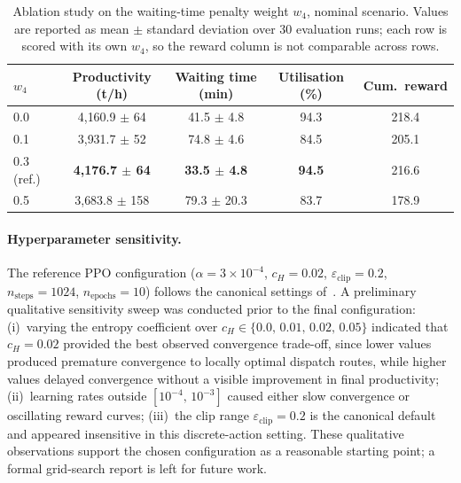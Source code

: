 \documentclass[11pt,a4paper]{article}
\begin{document}
\begin{table}[H]
\centering
\caption{Ablation study on the waiting-time penalty weight $w_4$, nominal scenario. Values are reported as mean $\pm$ standard deviation over 30 evaluation runs; each row is scored with its own $w_4$, so the reward column is not comparable across rows.}
\label{tab:ablation}
\small
\begin{tabular}{lcccc}
\toprule
\textbf{$w_4$} & \textbf{Productivity (t/h)} & \textbf{Waiting time (min)} & \textbf{Utilisation (\%)} & \textbf{Cum.\ reward} \\
\midrule
0.0  & 4{,}160.9 $\pm$ 64 & 41.5 $\pm$ 4.8 & 94.3 & 218.4 \\
0.1  & 3{,}931.7 $\pm$ 52 & 74.8 $\pm$ 4.6 & 84.5 & 205.1 \\
0.3 (ref.) & \textbf{4{,}176.7 $\pm$ 64} & \textbf{33.5 $\pm$ 4.8} & \textbf{94.5} & 216.6 \\
0.5  & 3{,}683.8 $\pm$ 158 & 79.3 $\pm$ 20.3 & 83.7 & 178.9 \\
\bottomrule
\end{tabular}

\end{table}

\paragraph{Hyperparameter sensitivity.}
The reference PPO configuration ($\alpha = 3 \times 10^{-4}$,
$c_H = 0.02$, $\varepsilon_{\text{clip}} = 0.2$,
$n_{\text{steps}} = 1024$, $n_{\text{epochs}} = 10$) follows the
canonical settings of~\cite{JohnSchulman2017}.
A preliminary qualitative sensitivity sweep was conducted prior to the final configuration:
(i)~varying the entropy coefficient over $c_H \in \{0.0,\, 0.01,\, 0.02,\, 0.05\}$
indicated that $c_H = 0.02$ provided the best observed convergence trade-off, since lower values produced premature convergence to locally optimal dispatch routes,
while higher values delayed convergence without a visible improvement in final productivity;
(ii)~learning rates outside $[10^{-4},\, 10^{-3}]$ caused either slow convergence
or oscillating reward curves;
(iii)~the clip range $\varepsilon_{\text{clip}} = 0.2$ is the canonical default~\cite{JohnSchulman2017}
and appeared insensitive in this discrete-action setting.
These qualitative observations support the chosen configuration as a reasonable starting point; a formal grid-search report is left for future work.

\end{document}
